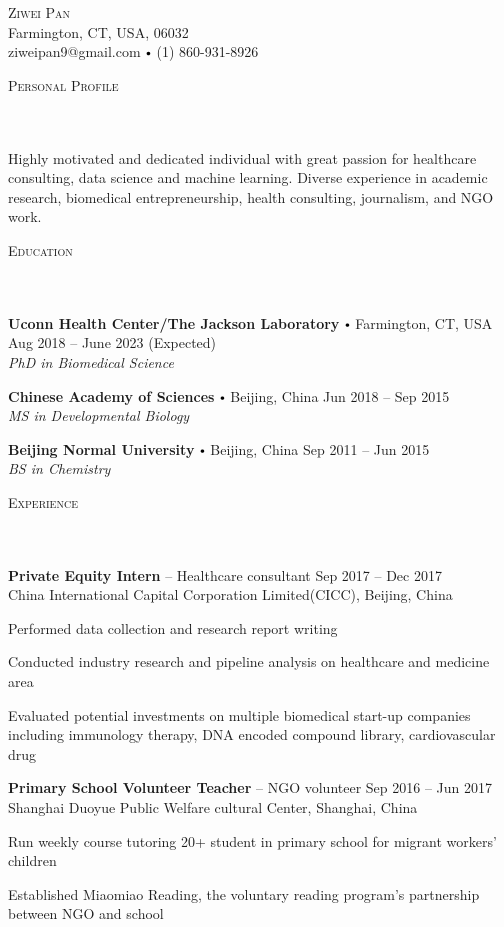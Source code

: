 \documentclass{article}
\newcommand{\contact}[3]{
\vspace*{5pt}
\begin{center}
{\LARGE \scshape {#1}}\\
\vspace{3pt}
#2 
\vspace{2pt}
#3
\end{center}
\vspace*{-8pt}
}
\newcommand{\header}[1]{{
\hspace*{-15pt}\vspace*{6pt} \textsc{#1}} \vspace*{-6pt} 
\lineunder
}
\newcommand{\lineunder}{
\vspace*{-8pt} \\ \hspace*{-18pt} 
\hrulefill \\
}
\newcommand{\content}{
\vspace*{2pt}%
}
\newcommand{\school}[4]{
\textbf{#1} \labelitemi #2 \hfill #3 \\ #4 \vspace*{5pt}
}
\newcommand{\employer}[4]{{
\vspace*{2pt}%
\textbf{#1} #2 \hfill #3\\ #4 \vspace*{2pt}}
}
\renewcommand{\labelitemi}{
$\vcenter{\hbox{\tiny$\bullet$}}$\hspace*{3pt}
}
\renewcommand{\labelitemii}{
$\vcenter{\hbox{\tiny$\bullet$}}$\hspace*{-3pt}
}
\newenvironment{bullet-list-minor}{
\begin{list}{\labelitemii}{\setlength\leftmargin{15pt} 
\topsep 0pt \itemsep -2pt}}{\vspace*{4pt}\end{list}
}
\begin{document}
\small
\smallskip
\vspace*{-44pt}

\contact{Ziwei Pan}
{Farmington, CT, USA, 06032\\}
{ziweipan9@gmail.com \labelitemi (1) 860-931-8926}
\vspace{15pt}
\header{Personal Profile}
\content{Highly motivated and dedicated individual with great passion for healthcare consulting, data science and machine learning. Diverse experience in academic research, biomedical entrepreneurship, health consulting, journalism, and NGO work.\vspace{5pt}}


\vspace*{4pt}%
\header{Education}
    \school{Uconn Health Center/The Jackson Laboratory}{Farmington, CT, USA}{Aug 2018 -- June 2023 (Expected)}
    {\textit{PhD in Biomedical Science}}

    \school{Chinese Academy of Sciences}{Beijing, China}{Jun 2018 -- Sep 2015}
    {\textit{MS in Developmental Biology}}
    
    \school{Beijing Normal University}{Beijing, China}{Sep 2011 -- Jun 2015}
    {\textit{BS in Chemistry}}
    
\vspace*{4pt}%
\header{Experience}
    \employer{Private Equity Intern}{-- Healthcare consultant}{Sep 2017 -- Dec 2017}{China International Capital Corporation Limited(CICC), Beijing, China}
	\begin{bullet-list-minor}
	\item Performed data collection and research report writing
	\item Conducted industry research and pipeline analysis on healthcare and medicine area
	\item Evaluated potential investments on multiple biomedical start-up companies including immunology therapy, DNA encoded compound library, cardiovascular drug
    \end{bullet-list-minor}
    
    \employer{Primary School Volunteer Teacher}{-- NGO volunteer}{Sep 2016 -- Jun 2017}{Shanghai Duoyue Public Welfare cultural Center, Shanghai, China}
	\begin{bullet-list-minor}
	\item Run weekly course tutoring 20+ student in primary school for migrant workers' children 
    \item Established Miaomiao Reading, the voluntary reading program’s partnership between NGO and school 
    \end{bullet-list-minor}
    
\end{document}

